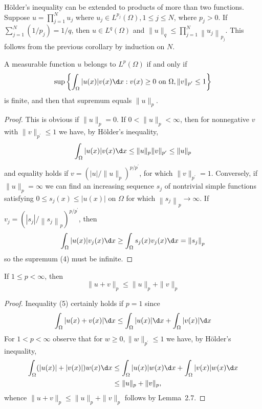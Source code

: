 \begin{corollary}
  Hölder's inequality can be extended to products of more than two functions. Suppose $u=\prod_{j=1}^N u_j$ where $u_j \in L^{p_j}(\Omega), 1 \leq j \leq N$, where $p_j>0$. If $\sum_{j=1}^N\left(1 / p_j\right)=1 / q$, then $u \in L^q(\Omega)$ and $\|u\|_q \leq \prod_{j=1}^N\left\|u_j\right\|_{p_j}$. This follows from the previous corollary by induction on $N$.
\end{corollary}

\begin{lemma}
  A measurable function $u$ belongs to $L^p(\Omega)$ if and only if
  \begin{equation}\label{eq:2.4}
    \sup \left\{\int_{\Omega}|u(x)| v(x) \d x: v(x) \geq 0 \text { on } \Omega,\|v\|_{p^{\prime}} \leq 1\right\}
  \end{equation}
  is finite, and then that supremum equals $\|u\|_p$.
\end{lemma}

\begin{proof}
  This is obvious if $\|u\|_p=0$. If $0<\|u\|_p<\infty$, then for nonnegative $v$ with $\|v\|_{p^{\prime}} \leq 1$ we have, by Hölder's inequality,
  \[
  \int_{\Omega}|u(x)| v(x) \d x \leq\|u\|_p\|v\|_{p^{\prime}} \leq\|u\|_p
  \]
  and equality holds if $v=\left(|u| /\|u\|_p\right)^{p / p^{\prime}}$, for which $\|v\|_{p^{\prime}}=1$.
  Conversely, if $\|u\|_p=\infty$ we can find an increasing sequence $s_j$ of nontrivial simple functions satisfying $0 \leq s_j(x) \leq|u(x)|$ on $\Omega$ for which $\left\|s_j\right\|_p \rightarrow \infty$. If $v_j=\left(\left|s_j\right| /\left\|s_j\right\|_p\right)^{p / p^{\prime}}$, then
  \[
  \int_{\Omega}|u(x)| v_j(x) \d x \geq \int_{\Omega} s_j(x) v_j(x) \d x=\left\|s_j\right\|_p
  \]
  so the supremum (4) must be infinite.
\end{proof}


\begin{theorem}
  If $1 \leq p<\infty$, then
  \begin{equation}\label{eq:2.5}
    \|u+v\|_p \leq\|u\|_p+\|v\|_p
  \end{equation}
\end{theorem}

\begin{proof}
  Inequality (5) certainly holds if $p=1$ since
  \[
  \int_{\Omega}|u(x)+v(x)| \d x \leq \int_{\Omega}|u(x)| \d x+\int_{\Omega}|v(x)| \d x
  \]
  For $1<p<\infty$ observe that for $w \geq 0,\|w\|_{p^{\prime}} \leq 1$ we have, by Hölder's inequality,
  \[
  \begin{aligned}
  \int_{\Omega}(|u(x)|+|v(x)|) w(x) \d x & \leq \int_{\Omega}|u(x)| w(x) \d x+\int_{\Omega}|v(x)| w(x) \d x \\
  & \leq\|u\|_p+\|v\|_p,
  \end{aligned}
  \]
  whence $\|u+v\|_p \leq\|u\|_p+\|v\|_p$ follows by Lemma~2.7.
\end{proof}

